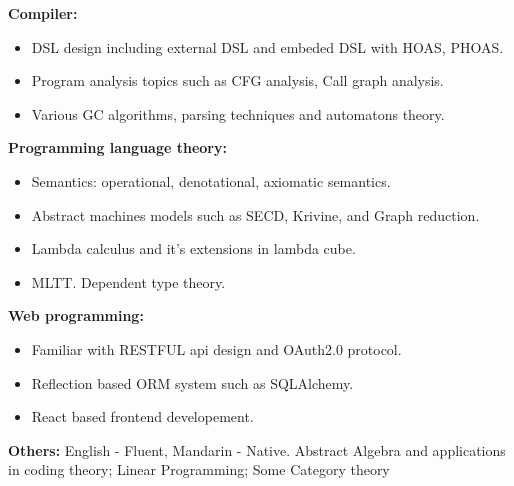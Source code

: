 \documentclass{resume}
\begin{document}
    \textbf{Compiler: }
    \begin{itemize}
        \item DSL design including external DSL and embeded DSL with HOAS, PHOAS.
        \item Program analysis topics such as CFG analysis, Call graph analysis.
        \item Various GC algorithms, parsing techniques and automatons theory.
    \end{itemize}

    \textbf{Programming language theory: }
    \begin{itemize}
        \item Semantics: operational, denotational, axiomatic semantics.
        \item Abstract machines models such as SECD, Krivine, and Graph reduction.
        \item Lambda calculus and it's extensions in lambda cube.
        \item MLTT. Dependent type theory.
    \end{itemize}

    \textbf{Web programming: }
    \begin{itemize}
        \item Familiar with RESTFUL api design and OAuth2.0 protocol.
        \item Reflection based ORM system such as SQLAlchemy.
        \item React based frontend developement.
    \end{itemize}

    \textbf{Others: }
        English - Fluent, Mandarin - Native.
        Abstract Algebra and applications in coding theory; Linear Programming; Some Category theory
\end{document}
